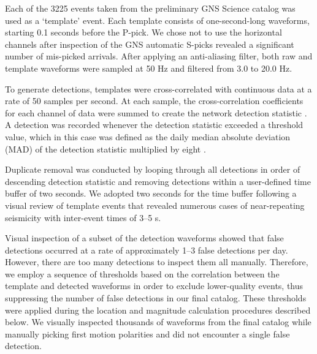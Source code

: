 Each of the 3225 events taken from the preliminary GNS Science catalog was used as a `template' event. Each template consists of one-second-long waveforms, starting 0.1 seconds before the P-pick. We chose not to use the horizontal channels after inspection of the GNS automatic S-picks revealed a significant number of mis-picked arrivals. After applying an anti-aliasing filter, both raw and template waveforms were sampled at 50 Hz and filtered from 3.0 to 20.0 Hz.

To generate detections, templates were cross-correlated with continuous
data at a rate of 50 samples per second. At each sample, the cross-correlation
coefficients for each channel of data were summed to create the network detection statistic \citep{Shelly_2007}. A detection was recorded whenever the detection statistic exceeded a threshold value, which in this case was defined as the daily median absolute deviation (MAD) of the detection statistic multiplied by eight \citep[as suggested by][]{Shelly_2007}.

Duplicate removal was conducted by looping through all detections in order of descending detection statistic and removing detections within a user-defined time buffer of two seconds. We adopted two seconds for the time buffer following a visual review of template events that revealed numerous cases of near-repeating seismicity with inter-event times of 3--5 s.

Visual inspection of a subset of the detection waveforms showed that false detections occurred at a rate of approximately 1--3 false detections per day. However, there are too many detections to inspect them all manually. Therefore, we employ a sequence of thresholds based on the correlation between the template and detected waveforms in order to exclude lower-quality events, thus suppressing the number of false detections in our final catalog. These thresholds were applied during the location and magnitude calculation procedures described below. We visually inspected thousands of waveforms from the final catalog while manually picking first motion polarities and did not encounter a single false detection.

